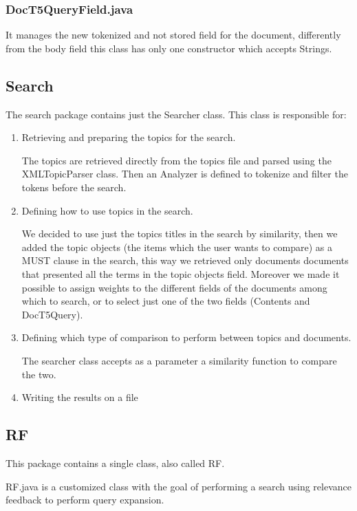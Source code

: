 \subsubsection{DocT5QueryField.java}
    
        It manages the new tokenized and not stored field for the document, differently from the body field this class has only one constructor which accepts Strings.
\subsection{Search}
\label{subsec:search}
  
  The search package contains just the Searcher class. This class is responsible for:
    \begin{enumerate}
    	\item Retrieving and preparing the topics for the search.
    	
    	The topics are retrieved directly from the topics file and parsed using the XMLTopicParser class.
    	Then an Analyzer is defined to tokenize and filter the tokens before the search.
    	\item Defining how to use topics in the search.
    	
    	We decided to use just the topics titles in the search by similarity, then we added the topic objects (the items which the user wants to compare) as a MUST clause in the search, this way we retrieved only documents documents that presented all the terms in the topic objects field.
    	Moreover we made it possible to assign weights to the different fields of the documents among which to search, or to select just one of the two fields (Contents and DocT5Query).
    	\item Defining which type of comparison to perform between topics and documents.
    	
    	The searcher class accepts as a parameter a similarity function to compare the two.
    	\item Writing the results on a file
    \end{enumerate}

\subsection{RF}
  
      This package contains a single class, also called RF.
        
        RF.java is a customized class with the goal of performing a search using relevance feedback to perform query expansion.
        
